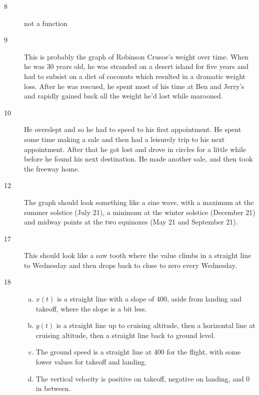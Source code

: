 \documentclass[letterpaper, landscape]{exam}
\begin{document}
\begin{description}
      \item[8] not a function

      \item[9] This is probably the graph of Robinson Crusoe's weight over time.
        When he was 30 years old, he was stranded on a desert island for five
        years and had to subsist on a diet of coconuts which resulted in a
        dramatic weight loss. After he was rescued, he spent most of his time
        at Ben and Jerry's and rapidly gained back all the weight he'd lost
        while marooned.

      \item[10]
        He overslept and so he had to speed to his first appointment. He spent
        some time making a sale and then had a leisurely trip to his next
        appointment. After that he got lost and drove in circles for a little
        while before he found his next destination. He made another sale, and
        then took the freeway home.

      \item[12] The graph should look something like a sine wave, with a maximum at
        the summer solstice (July 21), a minimum at the winter solstice
        (December 21) and midway points at the two equinoxes (May 21 and
        September 21).

      \item[17] This should look like a saw tooth where the value climbs in a
        straight line to Wednesday and then drops back to close to zero every
        Wednesday.

      \item[18]
        \begin{enumerate}[(a)]
          \item $x(t)$ is a straight line with a slope of 400, aside from
            landing and takeoff, where the slope is a bit less.

          \item $y(t)$ is a straight line up to cruising altitude, then a
            horizontal line at cruising altitude, then a straight line back to
            ground level.

          \item The ground speed is a straight line at 400 for the flight, with
            some lower values for takeoff and landing.

          \item The vertical velocity is positive on takeoff, negative on
            landing, and 0 in between.
        \end{enumerate}


\end{description}
\end{document}
